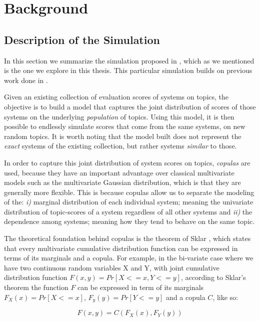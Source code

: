 \chapter{Background}\label{ch:2}

\section{Description of the Simulation}\label{sec:sim-description}

In this section we summarize the simulation proposed in \cite{Urbano2018}, which as we mentioned is the one we explore in this thesis. This particular simulation builds on previous work done in \cite{Urbano2016}. 

Given an existing collection of evaluation scores of systems on topics, the objective is to build a model that captures the joint distribution of scores of those systems on the underlying \textit{population} of topics. Using this model, it is then possible to endlessly simulate scores that come from the same systems, on new random topics. It is worth noting that the model built does not represent the \textit{exact} systems of the existing collection, but rather systems \textit{similar} to those. 

In order to capture this joint distribution of system scores on topics, \textit{copulas} are used, because they have an important advantage over classical multivariate models such as the multivariate Gaussian distribution, which is that they are generally more flexible. This is because copulas allow us to separate the modeling of the: \textit{i)} marginal distribution of each individual system; meaning the univariate distribution of topic-scores of a system regardless of all other systems and \textit{ii)} the dependence among systems; meaning how they tend to behave on the same topic. 

The theoretical foundation behind copulas is the theorem of Sklar \cite{Sklar1959}, which states that every multivariate cumulative distribution function can be expressed in terms of its marginals and a copula. For example, in the bi-variate case where we have two continuous random variables X and Y, with joint cumulative distribution function $F(x,y) = Pr[X <= x, Y <= y]$, according to Sklar's theorem the function $F$ can be expressed in term of its marginals $F_X(x) = Pr[X <= x]$, $F_y(y) = Pr[Y <= y]$ and a copula $C$, like so: 

\begin{equation}
	F(x,y) = C(F_X(x), F_Y(y))
\end{equation}

